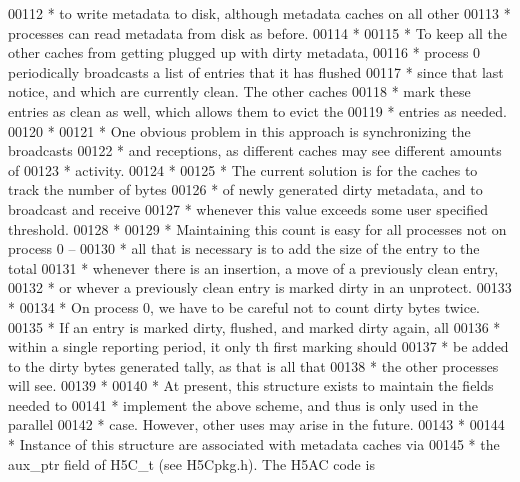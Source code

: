 \begin{DoxyCode}
00112 \textcolor{comment}{ * to write metadata to disk, although metadata caches on all other}
00113 \textcolor{comment}{ * processes can read metadata from disk as before.}
00114 \textcolor{comment}{ *}
00115 \textcolor{comment}{ * To keep all the other caches from getting plugged up with dirty metadata,}
00116 \textcolor{comment}{ * process 0 periodically broadcasts a list of entries that it has flushed}
00117 \textcolor{comment}{ * since that last notice, and which are currently clean.  The other caches}
00118 \textcolor{comment}{ * mark these entries as clean as well, which allows them to evict the}
00119 \textcolor{comment}{ * entries as needed.}
00120 \textcolor{comment}{ *}
00121 \textcolor{comment}{ * One obvious problem in this approach is synchronizing the broadcasts}
00122 \textcolor{comment}{ * and receptions, as different caches may see different amounts of}
00123 \textcolor{comment}{ * activity.}
00124 \textcolor{comment}{ *}
00125 \textcolor{comment}{ * The current solution is for the caches to track the number of bytes}
00126 \textcolor{comment}{ * of newly generated dirty metadata, and to broadcast and receive}
00127 \textcolor{comment}{ * whenever this value exceeds some user specified threshold.}
00128 \textcolor{comment}{ *}
00129 \textcolor{comment}{ * Maintaining this count is easy for all processes not on process 0 --}
00130 \textcolor{comment}{ * all that is necessary is to add the size of the entry to the total}
00131 \textcolor{comment}{ * whenever there is an insertion, a move of a previously clean entry,}
00132 \textcolor{comment}{ * or whever a previously clean entry is marked dirty in an unprotect.}
00133 \textcolor{comment}{ *}
00134 \textcolor{comment}{ * On process 0, we have to be careful not to count dirty bytes twice.}
00135 \textcolor{comment}{ * If an entry is marked dirty, flushed, and marked dirty again, all}
00136 \textcolor{comment}{ * within a single reporting period, it only th first marking should}
00137 \textcolor{comment}{ * be added to the dirty bytes generated tally, as that is all that}
00138 \textcolor{comment}{ * the other processes will see.}
00139 \textcolor{comment}{ *}
00140 \textcolor{comment}{ * At present, this structure exists to maintain the fields needed to}
00141 \textcolor{comment}{ * implement the above scheme, and thus is only used in the parallel}
00142 \textcolor{comment}{ * case.  However, other uses may arise in the future.}
00143 \textcolor{comment}{ *}
00144 \textcolor{comment}{ * Instance of this structure are associated with metadata caches via}
00145 \textcolor{comment}{ * the aux\_ptr field of H5C\_t (see H5Cpkg.h).  The H5AC code is}

\end{DoxyCode}
